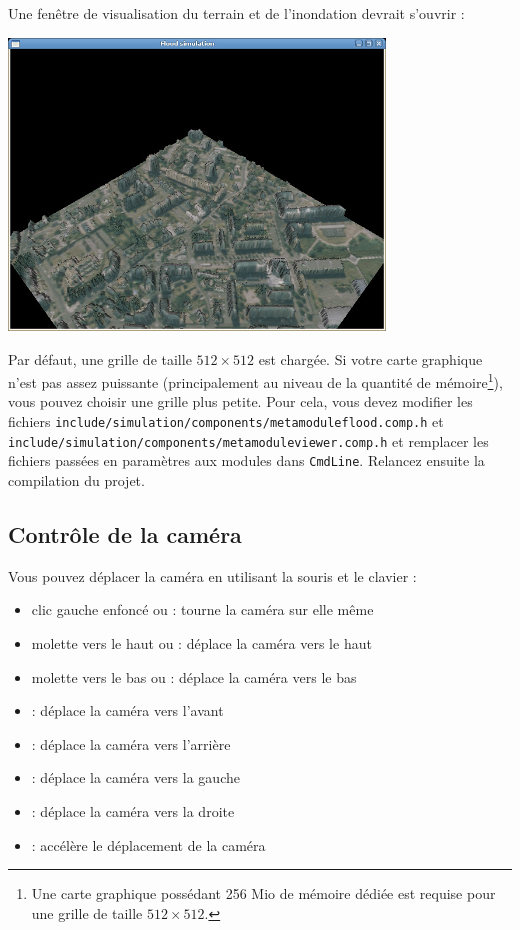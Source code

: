 \documentclass[a4paper, 12pt]{article}
\begin{document}
Une fenêtre de visualisation du terrain et de l'inondation devrait s'ouvrir :

\begin{center}
\includegraphics[width=0.75\textwidth]{include/captures/1.jpg}
\end{center}

Par défaut, une grille de taille $512\times512$ est chargée. Si votre carte
graphique n'est pas assez puissante (principalement au niveau de la quantité de
mémoire\footnote{Une carte graphique possédant 256 Mio de mémoire dédiée est
requise pour une grille de taille $512\times512$.}), vous pouvez choisir une
grille plus petite. Pour cela, vous devez modifier les fichiers
\texttt{include/simulation/components/metamoduleflood.comp.h} et
\texttt{include/simulation/components/metamoduleviewer.comp.h} et remplacer les
fichiers passées en paramètres aux modules dans \texttt{CmdLine}. Relancez
ensuite la compilation du projet.

\subsection{Contrôle de la caméra}

Vous pouvez déplacer la caméra en utilisant la souris et le clavier :

\begin{itemize}
\item clic gauche enfoncé ou \UArrow \DArrow \LArrow \RArrow : tourne la caméra
sur elle même
\item molette vers le haut ou \PgUp : déplace la caméra vers le haut
\item molette vers le bas ou \PgDown : déplace la caméra vers le bas
\item {} : déplace la caméra vers l'avant
\item {} : déplace la caméra vers l'arrière
\item {} : déplace la caméra vers la gauche
\item {} : déplace la caméra vers la droite
\item \Shift : accélère le déplacement de la caméra \\
\end{itemize}
\end{document}
